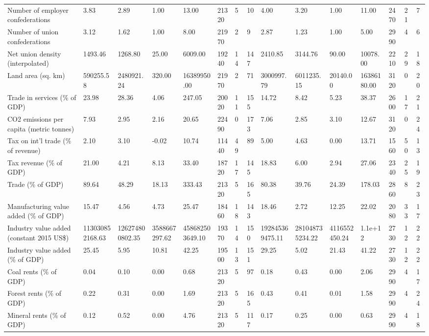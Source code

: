 \begin{longtable}{lllllllllllllll}
\addlinespace
Number of employer confederations & 3.83 & 2.89 & 1.00 & 13.00 & 21320 & 5 & 10 & 4.00 & 3.20 & 1.00 & 11.00 & 2470 & 21 & 7\\
Number of union confederations & 3.12 & 1.62 & 1.00 & 8.00 & 21970 & 2 & 9 & 2.87 & 1.23 & 1.00 & 5.00 & 2990 & 4 & 6\\
Net union density (interpolated) & 1493.46 & 1268.80 & 25.00 & 6009.00 & 19240 & 14 & 147 & 2410.85 & 3144.76 & 90.00 & 10078.00 & 2210 & 29 & 18\\
Land area (sq. km) & 590255.58 & 2480921.24 & 320.00 & 16389950.00 & 21970 & 2 & 71 & 3000997.79 & 6011235.15 & 20140.00 & 16386180.00 & 3120 & 0 & 20\\
Trade in services (\% of GDP) & 23.98 & 28.36 & 4.06 & 247.05 & 20020 & 11 & 155 & 14.72 & 8.42 & 5.23 & 38.37 & 2600 & 17 & 21\\
\addlinespace
CO2 emissions per capita (metric tonnes) & 7.93 & 2.95 & 2.16 & 20.65 & 22490 & 0 & 173 & 7.06 & 2.85 & 3.10 & 12.67 & 3120 & 0 & 24\\
Tax on int'l trade (\% of revenue) & 2.10 & 3.10 & -0.02 & 10.74 & 11440 & 49 & 89 & 5.00 & 4.63 & 0.00 & 13.71 & 1560 & 50 & 13\\
Tax revenue (\% of GDP) & 21.00 & 4.21 & 8.13 & 33.40 & 18720 & 17 & 145 & 18.83 & 6.00 & 2.94 & 27.06 & 2340 & 25 & 19\\
Trade (\% of GDP) & 89.64 & 48.29 & 18.13 & 333.43 & 21320 & 5 & 165 & 80.38 & 39.76 & 24.39 & 178.03 & 2860 & 8 & 23\\
Manufacturing value added (\% of GDP) & 15.47 & 4.56 & 4.73 & 25.47 & 18460 & 18 & 143 & 18.46 & 2.72 & 12.25 & 22.02 & 2080 & 33 & 17\\
\addlinespace
Industry value added (constant 2015 US\$) & 113030852168.63 & 126274800802.35 & 3588667297.62 & 458682503649.10 & 19370 & 14 & 150 & 192845369475.11 & 281048735234.22 & 4116552450.24 & 1.1e+12 & 2730 & 12 & 22\\
Industry value added (\% of GDP) & 25.45 & 5.95 & 10.81 & 42.25 & 19500 & 13 & 151 & 29.25 & 5.02 & 21.43 & 41.22 & 2730 & 12 & 22\\
Coal rents (\% of GDP) & 0.04 & 0.10 & 0.00 & 0.68 & 21320 & 5 & 97 & 0.18 & 0.43 & 0.00 & 2.06 & 2990 & 4 & 17\\
Forest rents (\% of GDP) & 0.22 & 0.31 & 0.00 & 1.69 & 21320 & 5 & 165 & 0.43 & 0.41 & 0.01 & 1.58 & 2990 & 4 & 24\\
Mineral rents (\% of GDP) & 0.12 & 0.52 & 0.00 & 4.76 & 21320 & 5 & 117 & 0.17 & 0.25 & 0.00 & 0.63 & 2990 & 4 & 18\\

\end{longtable}
